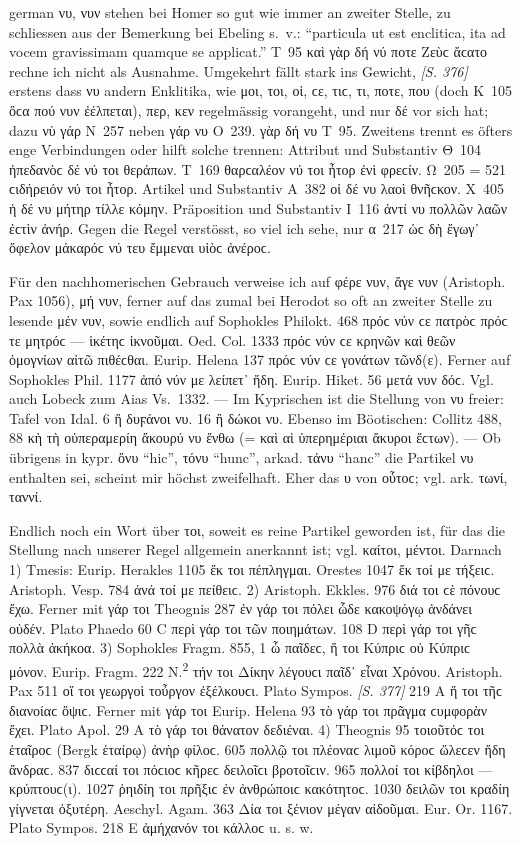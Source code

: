 \begin{otherlanguage*}{german}
νυ, νυν stehen bei Homer so gut wie immer an zweiter Stelle, zu schliessen aus der Bemerkung bei Ebeling s.~v.: “particula ut est enclitica, ita ad vocem gravissimam quamque se applicat.” Τ~95 καὶ γὰρ δή νύ ποτε Ζεὺϲ ἄϲατο rechne ich nicht als Ausnahme. Umgekehrt fällt stark ins Gewicht, \hypertarget{p376}{\emph{[S. 376]}}\label{p376} erstens dass νυ andern Enklitika, wie μοι, τοι, οἱ, ϲε, τιϲ, τι, ποτε, που (doch Κ~105 ὅϲα πού νυν ἐέλπεται), περ, κεν regelmässig vorangeht, und nur δέ vor sich hat; dazu νὺ γάρ Ν~257 neben γάρ νυ Ο~239. γὰρ δή νυ Τ~95. Zweitens trennt es öfters enge Verbindungen oder hilft solche trennen: Attribut und Substantiv Θ~104 ἠπεδανὸϲ δέ νύ τοι θεράπων. Τ~169 θαρϲαλέον νύ τοι ἦτορ ἐνὶ φρεϲίν. Ω~205 = 521 ϲιδήρειόν νύ τοι ἦτορ. Artikel und Substantiv Α~382 οἱ δέ νυ λαοὶ θνῆϲκον. Χ~405 ἡ δέ νυ μήτηρ τίλλε κόμην. Präposition und Substantiv Ι~116 ἀντί νυ πολλῶν λαῶν ἐϲτὶν ἀνήρ. Gegen die Regel verstösst, so viel ich sehe, nur α~217 ὡϲ δὴ ἔγωγ᾽ ὄφελον μάκαρόϲ νύ τευ ἔμμεναι υἱὸϲ ἀνέροϲ.

Für den nachhomerischen Gebrauch verweise ich auf φέρε νυν, ἄγε νυν (Aristoph. Pax 1056), μή νυν, ferner auf das zumal bei Herodot so oft an zweiter Stelle zu lesende μέν νυν, sowie endlich auf Sophokles Philokt. 468 πρόϲ νύν ϲε πατρὸϲ πρόϲ τε μητρόϲ — ἱκέτηϲ ἱκνοῦμαι. Oed. Col. 1333 πρόϲ νύν ϲε κρηνῶν καὶ θεῶν ὁμογνίων αἰτῶ πιθέϲθαι. Eurip. Helena 137 πρόϲ νύν ϲε γονάτων τῶνδ(ε). Ferner auf Sophokles Phil. 1177 ἀπό νύν με λείπετ᾽ ἤδη. Eurip. Hiket. 56 μετά νυν δόϲ. Vgl. auch Lobeck zum Aias Vs.~1332. — Im Kyprischen ist die Stellung von νυ freier: Tafel von Idal. 6 ἢ δυϝάνοι νυ. 16 ἢ δώκοι νυ. Ebenso im Böotischen: Collitz 488, 88 κὴ τὴ οὑπεραμερίη ἄκουρύ νυ ἔνθω (= καὶ αἱ ὑπερημέριαι ἄκυροι ἔϲτων). — Ob übrigens in kypr. ὄνυ “hic”, τόνυ “hunc”, arkad. τάνυ “hanc” die Partikel νυ enthalten sei, scheint mir höchst zweifelhaft. Eher das υ von οὗτοϲ; vgl. ark. τωνί, ταννί.

Endlich noch ein Wort über τοι, soweit es reine Partikel geworden ist, für das die Stellung nach unserer Regel allgemein anerkannt ist; vgl. καίτοι, μέντοι. Darnach 1) Tmesis: Eurip. Herakles 1105 ἔκ τοι πέπληγμαι. Orestes 1047 ἔκ τοί με τήξειϲ. Aristoph. Vesp. 784 ἀνά τοί με πείθειϲ. 2) Aristoph. Ekkles. 976 διά τοι ϲὲ πόνουϲ ἔχω. Ferner mit γάρ τοι Theognis 287 ἐν γάρ τοι πόλει ὧδε κακοψόγῳ ἁνδάνει οὐδέν. Plato Phaedo 60 C περὶ γάρ τοι τῶν ποιημάτων. 108 D περὶ γάρ τοι γῆϲ πολλὰ ἀκήκοα. 3) Sophokles Fragm. 855, 1 ὦ παῖδεϲ, ἥ τοι Κύπριϲ οὐ Κύπριϲ μόνον. Eurip. Fragm. 222 Ν.\textsuperscript{2} τήν τοι Δίκην λέγουϲι παῖδ᾽ εἶναι Χρόνου. Aristoph. Pax 511 οἵ τοι γεωργοὶ τοὖργον ἐξέλκουϲι. Plato Sympos. \hypertarget{p377}{\emph{[S. 377]}}\label{p377} 219 A ἥ τοι τῆϲ διανοίαϲ ὄψιϲ. Ferner mit γάρ τοι Eurip. Helena 93 τὸ γάρ τοι πρᾶγμα ϲυμφορὰν ἔχει. Plato Apol. 29 Α τὸ γάρ τοι θάνατον δεδιέναι. 4) Theognis 95 τοιοῦτόϲ τοι ἑταῖροϲ (Bergk ἑταίρῳ) ἀνὴρ φίλοϲ. 605 πολλῷ τοι πλέοναϲ λιμοῦ κόροϲ ὤλεϲεν ἤδη ἄνδραϲ. 837 διϲϲαί τοι πόϲιοϲ κῆρεϲ δειλοῖϲι βροτοῖϲιν. 965 πολλοί τοι κίβδηλοι — κρύπτουϲ(ι). 1027 ῥηιδίη τοι πρῆξιϲ ἐν ἀνθρώποιϲ κακότητοϲ. 1030 δειλῶν τοι κραδίη γίγνεται ὀξυτέρη. Aeschyl. Agam. 363 Δία τοι ξένιον μέγαν αἰδοῦμαι. Eur. Or. 1167. Plato Sympos. 218 Ε ἀμήχανόν τοι κάλλοϲ u. s. w.


\end{otherlanguage*}
